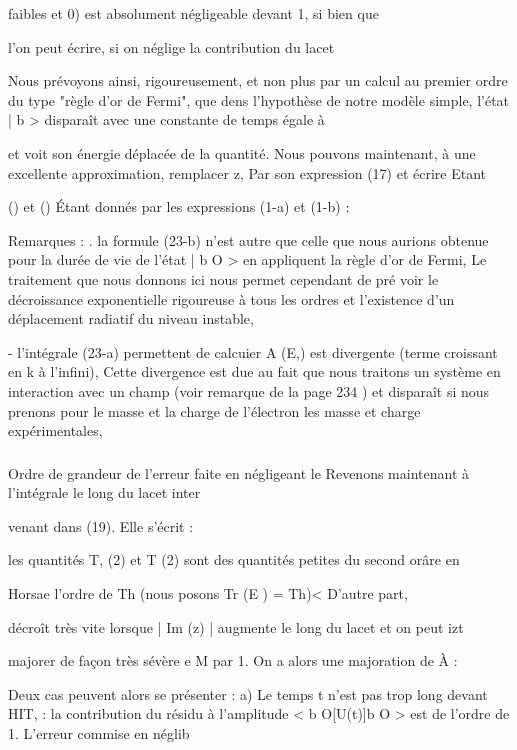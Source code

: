 faibles et 0) est absolument négligeable devant 1, si bien que

l'on peut écrire, si on néglige la contribution du lacet

Nous prévoyons ainsi, rigoureusement, et non plus par un calcul
au premier ordre du type "règle d'or de Fermi", que dens l'hypothèse de notre
modèle simple, l'état | b  > disparaît avec une constante de temps égale à

 et voit son énergie déplacée de la quantité.
Nous pouvons maintenant, à une excellente approximation, remplacer
z, Par son expression (17) et écrire
Etant


() et () Étant donnés par les expressions (1-a) et (1-b) :

Remarques : . la formule (23-b) n'est autre que celle que nous aurions
obtenue pour la durée de vie de l'état | b O > en appliquent la règle d'or
de Fermi, Le traitement que nous donnons ici nous permet cependant de pré
voir le décroissance exponentielle rigoureuse à tous les ordres et l'existence d'un déplacement radiatif du niveau instable,

- l'intégrale (23-a) permettent de calcuier A (E,) est divergente (terme croissant en k à l'infini), Cette divergence est due au fait
que nous traitons un système en interaction avec un champ (voir remarque de
la page 234 ) et disparaît si nous prenons pour le masse et la charge de
l'électron les masse et charge expérimentales,

\subsubsection{} Ordre de grandeur de l'erreur faite en négligeant le%
Revenons maintenant à l'intégrale le long du lacet inter

venant dans (19). Elle s'écrit :


les quantités T, (2) et T (2) sont des quantités petites du second orâre en

Horsae l'ordre de Th (nous posons Tr (E ) = Th)< D'autre part,

décroît très vite lorsque | Im (z) | augmente le long du lacet et on peut
izt

majorer de façon très sévère e M par 1. On a alors une majoration de À :

Deux cas peuvent alors se présenter :
a) Le temps t n'est pas trop long devant HIT, : la contribution du résidu à
l'amplitude < b O[U(t)]b O > est de l'ordre de 1. L'erreur commise en néglib

